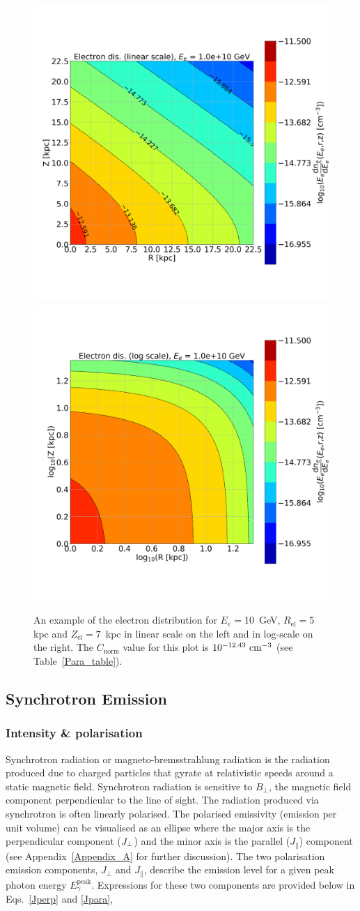 \documentclass[usenatbib]{mnras}
\begin{document}
\begin{figure}
\centering
\includegraphics[width=0.49\linewidth]{Images/Linear_EdNdE.png}%
\includegraphics[width = 0.49\linewidth]{Images/Log_EdNdE.png}
\caption{An example of the electron distribution for $E_e = $10~GeV, $R_{\mathrm{el}} = 5$ kpc and $Z_{\mathrm{el}} = 7$~kpc in linear scale on the left and in log-scale on the right. The $C_\mathrm{norm}$ value for this plot is $10^{-12.43}~{\rm cm}^{-3}$ (see Table~\ref{Para_table}).}  
\label{fig:electron_density}
\end{figure}
\subsection{Synchrotron Emission}\label{Synchrotron_theory}

\subsubsection{Intensity \& polarisation}
Synchrotron radiation or magneto-bremsstrahlung radiation is the radiation produced due to charged particles that gyrate at relativistic speeds around a static magnetic field. Synchrotron radiation is sensitive to $B_{\perp}$, the magnetic field component perpendicular to the line of sight. The radiation produced via synchrotron is often linearly polarised.
The polarised emissivity (emission per unit volume) can be visualised as an ellipse where the major axis is the perpendicular component ($J_{\rm \perp}$) and the minor axis is the parallel ($J_{\parallel}$) component (see Appendix~\ref{Appendix_A} for further discussion). 
The two polarisation emission components, $J_{\perp}$ and $J_{\parallel}$, describe the emission level for a given peak photon energy $E_{\gamma}^{\mathrm{peak}}$.
Expressions for these two components are provided below in Eqs.~\ref{Jperp} and \ref{Jpara},
\end{document}
